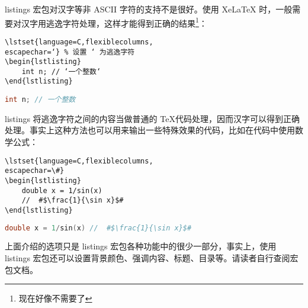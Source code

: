 listings 宏包对汉字等非 ASCII 字符的支持不是很好。使用 XeLaTeX 时，一般需要对汉字用逃逸字符处理，这样才能得到正确的结果\footnote{现在好像不需要了}：

\begin{minipage}[t]{0.45\textwidth}
\begin{verbatim}
\lstset{language=C,flexiblecolumns,
escapechar=‘} % 设置 ‘ 为逃逸字符
\begin{lstlisting}
    int n; // ‘一个整数‘
\end{lstlisting}
\end{verbatim}
\end{minipage}
\hfill
\begin{minipage}[t]{0.45\textwidth}
    \lstinline[language=C,flexiblecolumns,escapechar=“,keywordstyle = \bfseries,commentstyle=\normalfont]
        {int n; // 一个整数}
\end{minipage}

\vspace{0.2cm}
listings 将逃逸字符之间的内容当做普通的 \TeX 代码处理，因而汉字可以得到正确处理。事实上这种方法也可以用来输出一些特殊效果的代码，比如在代码中使用数学公式：

\begin{minipage}[t]{0.45\textwidth}
\begin{verbatim}
\lstset{language=C,flexiblecolumns,
escapechar=\#}
\begin{lstlisting}
    double x = 1/sin(x) 
    //  #$\frac{1}{\sin x}$#
\end{lstlisting}
\end{verbatim}
\end{minipage}
\hfill
\begin{minipage}[t]{0.45\textwidth}
    \begin{lstlisting}[language=C,flexiblecolumns,escapechar=\#,keywordstyle = \bfseries,commentstyle=\normalfont]
double x = 1/sin(x) //  #$\frac{1}{\sin x}$#
    \end{lstlisting}
\end{minipage}

\vspace{0.2cm}
上面介绍的选项只是 listings 宏包各种功能中的很少一部分，事实上，使用 listings 宏包还可以设置背景颜色、强调内容、标题、目录等。请读者自行查阅宏包文档。